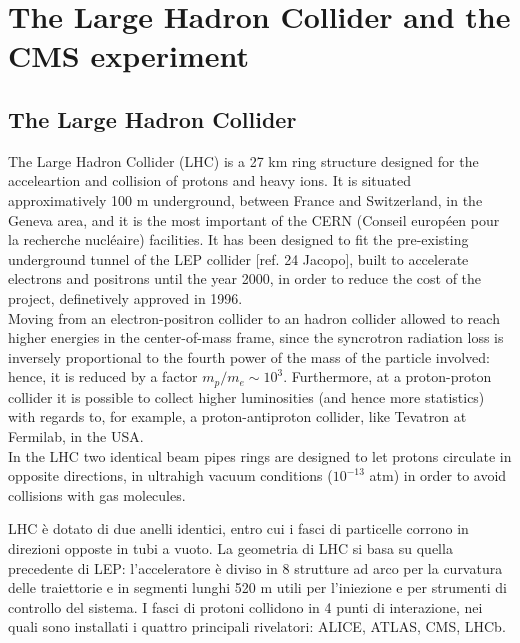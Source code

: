 \chapter{The Large Hadron Collider and the CMS experiment}
\label{chap:LHC_CMS}

\section{The Large Hadron Collider}
The Large Hadron Collider (LHC) is a 27 km ring structure designed for the acceleartion and collision of protons and heavy ions. It is situated approximatively 100 m underground, between France and Switzerland, in the Geneva area, and it is the most important of the CERN (Conseil europ\'een pour la recherche nucl\'eaire) facilities. It has been designed to fit the pre-existing underground tunnel of the LEP collider [ref. 24 Jacopo], built to accelerate electrons and positrons until the year 2000, in order to reduce the cost of the project, definetively approved in 1996.\\
Moving from an electron-positron collider to an hadron collider allowed to reach higher energies in the center-of-mass frame, since the syncrotron radiation loss is inversely proportional to the fourth power of the mass of the particle involved: hence, it is reduced by a factor $m_p/m_e \sim 10^3$. Furthermore, at a proton-proton collider it is possible to collect higher luminosities (and hence more statistics) with regards to, for example, a proton-antiproton collider, like Tevatron at Fermilab, in the USA.\\
In the LHC two identical beam pipes rings are designed to let protons circulate in opposite directions, in ultrahigh vacuum conditions ($10^{-13}$ atm) in order to avoid collisions with gas molecules. 

LHC \`e dotato di due anelli identici, entro cui i fasci di particelle corrono in direzioni opposte in tubi a vuoto. La geometria di LHC si basa su quella precedente di LEP: l'acceleratore \`e diviso in 8 strutture ad arco per la curvatura delle traiettorie e in segmenti lunghi 520 m utili per l'iniezione e per strumenti di controllo del sistema. I fasci di protoni collidono in 4 punti di interazione, nei quali sono installati i quattro principali rivelatori: ALICE, ATLAS, CMS, LHCb.

